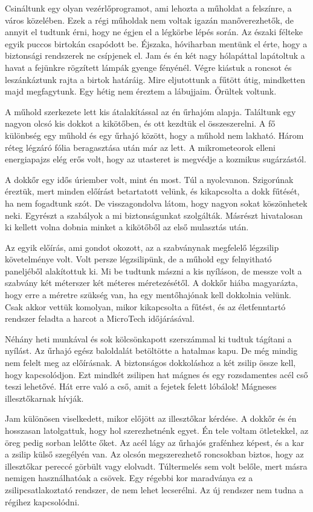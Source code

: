 \documentclass[10pt]{memoir}
\begin{document}
Csináltunk egy olyan vezérlőprogramot, ami lehozta a műholdat a felszínre, a
város közelében. Ezek a régi műholdak nem voltak igazán manőverezhetők, de
annyit el tudtunk érni, hogy ne égjen el a légkörbe lépés során. Az északi
félteke egyik puccos birtokán csapódott be. Éjszaka, hóviharban mentünk el
érte, hogy a biztonsági rendszerek ne csípjenek el. Jam és én két nagy
hólapáttal lapátoltuk a havat a fejünkre rögzített lámpák gyenge fényénél.
Végre kiástuk a roncsot és leszánkáztunk rajta a birtok határáig. Mire
eljutottunk a fűtött útig, mindketten majd megfagytunk. Egy hétig nem éreztem a
lábujjaim. Őrültek voltunk.

A műhold szerkezete lett kis átalakítással az én űrhajóm alapja. Találtunk egy
nagyon olcsó kis dokkot a kikötőben, és ott kezdtük el összeszerelni. A fő
különbség egy műhold és egy űrhajó között, hogy a műhold nem lakható. Három
réteg légzáró fólia beragasztása után már az lett. A mikrometeorok elleni
energiapajzs elég erős volt, hogy az utasteret is megvédje a kozmikus
sugárzástól.

A dokkőr egy idős úriember volt, mint én most. Túl a nyolcvanon. Szigorúnak
éreztük, mert minden előírást betartatott velünk, és kikapcsolta a dokk
fűtését, ha nem fogadtunk szót. De visszagondolva látom, hogy nagyon sokat
köszönhetek neki. Egyrészt a szabályok a mi biztonságunkat szolgálták. Másrészt
hivatalosan ki kellett volna dobnia minket a kikötőből az első mulasztás után.

Az egyik előírás, ami gondot okozott, az a szabványnak megfelelő légzsilip
követelménye volt. Volt persze légzsilipünk, de a műhold egy felnyitható
paneljéből alakítottuk ki. Mi be tudtunk mászni a kis nyíláson, de messze volt
a szabvány két méterszer két méteres méretezésétől. A dokkőr hiába magyarázta,
hogy erre a méretre szükség van, ha egy mentőhajónak kell dokkolnia velünk.
Csak akkor vettük komolyan, mikor kikapcsolta a fűtést, és az életfenntartó
rendszer feladta a harcot a MicroTech időjárásával.

Néhány heti munkával és sok kölcsönkapott szerszámmal ki tudtuk tágítani a
nyílást. Az űrhajó egész baloldalát betöltötte a hatalmas kapu. De még mindig
nem felelt meg az előírásnak. A biztonságos dokkoláshoz a két zsilip össze
kell, hogy kapcsolódjon. Ezt mindkét zsilipen hat mágnes és egy rozsdamentes
acél cső teszi lehetővé. Hát erre való a cső, amit a fejetek felett lóbálok!
Mágneses illesztőkarnak hívják.

Jam különösen viselkedett, mikor előjött az illesztőkar kérdése. A dokkőr és én
hosszasan latolgattuk, hogy hol szerezhetnénk egyet. Én tele voltam ötletekkel,
az öreg pedig sorban lelőtte őket. Az acél lágy az űrhajós grafénhez képest, és
a kar a zsilip külső szegélyén van. Az olcsón megszerezhető roncsokban biztos,
hogy az illesztőkar pereccé görbült vagy elolvadt. Túltermelés sem volt belőle,
mert másra nemigen használhatóak a csövek. Egy régebbi kor maradványa ez a
zsilipcsatlakoztató rendszer, de nem lehet lecserélni. Az új rendszer nem tudna
a régihez kapcsolódni.
\end{document}
